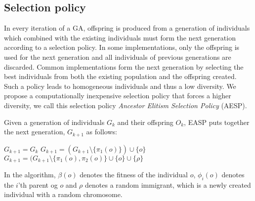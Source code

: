 \subsection{Selection policy}
In every iteration of a GA, offspring is produced from a generation of individuals which combined with the existing individuals must form the next generation according to a selection policy.
In some implementations, only the offspring is used for the next generation and all individuals of previous generations are discarded. Common implementations form the next generation by selecting the best individuals from both the existing population and the offspring created\cite{masterthesis}. Such a policy leads to homogeneous individuals and thus a low diversity.
We propose a computationally inexpensive selection policy that forces a higher diversity, we call this selection policy \emph{Ancestor Elitism Selection Policy} (AESP).

Given a generation of individuals $G_k$ and their offspring $O_k$, EASP puts together the next generation, $G_{k+1}$ as follows:

\begin{algorithmic}
\State $G_{k+1} = G_k$
    		\State $G_{k+1} = (G_{k+1} \setminus \{\pi_1(o)\}) \cup \{o\}$
		\EndIf
	\Else
    	    \State $G_{k+1} = (G_{k+1} \setminus \{\pi_1(o), \pi_2(o)\} \cup \{o\} \cup \{\rho\}$
	    \EndIf
	\EndIf
\EndFor
\end{algorithmic}

In the algorithm, $\beta(o)$ denotes the fitness of the individual $o$, $\phi_i(o)$ denotes the $i$'th parent og $o$ and $\rho$ denotes a random immigrant, which is a newly created individual with a random chromosome.



